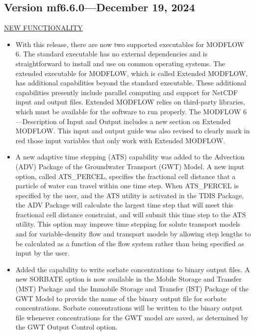 	
\subsection{Version mf6.6.0---December 19, 2024}
	
\underline{NEW FUNCTIONALITY}
\begin{itemize}
    \item With this release, there are now two supported executables for MODFLOW 6.  The standard executable has no external dependencies and is straightforward to install and use on common operating systems.  The extended executable for MODFLOW, which is called Extended MODFLOW, has additional capabilities beyond the standard executable.  These additional capabilities presently include parallel computing and support for NetCDF input and output files.  Extended MODFLOW relies on third-party libraries, which must be available for the software to run properly.  The MODFLOW 6---Description of Input and Output includes a new section on Extended MODFLOW.  This input and output guide was also revised to clearly mark in red those input variables that only work with Extended MODFLOW.  
    \item A new adaptive time stepping (ATS) capability was added to the Advection (ADV) Package of the Groundwater Transport (GWT) Model.  A new input option, called ATS\_PERCEL, specifies the fractional cell distance that a particle of water can travel within one time step.  When ATS\_PERCEL is specified by the user, and the ATS utility is activated in the TDIS Package, the ADV Package will calculate the largest time step that will meet this fractional cell distance constraint, and will submit this time step to the ATS utility.  This option may improve time stepping for solute transport models and for variable-density flow and transport models by allowing step lengths to be calculated as a function of the flow system rather than being specified as input by the user.
    \item Added the capability to write sorbate concentrations to binary output files.  A new SORBATE option is now available in the Mobile Storage and Transfer (MST) Package and the Immobile Storage and Transfer (IST) Package of the GWT Model to provide the name of the binary output file for sorbate concentrations. Sorbate concentrations will be written to the binary output file whenever concentrations for the GWT model are saved, as determined by the GWT Output Control option.

\end{itemize}
